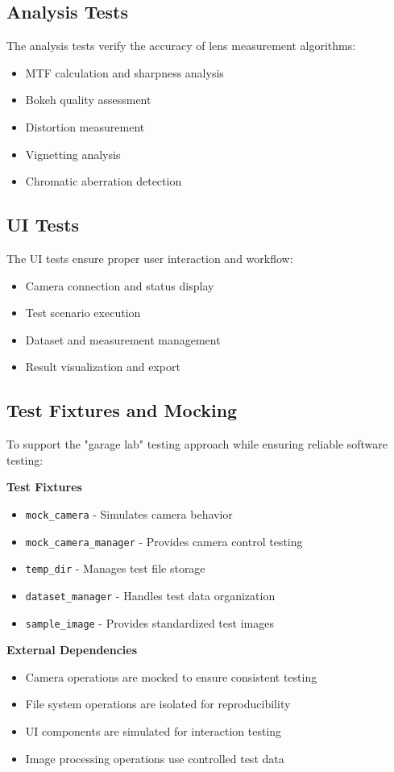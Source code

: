 \subsection{Analysis Tests}
The analysis tests verify the accuracy of lens measurement algorithms:
\begin{itemize}
    \item MTF calculation and sharpness analysis
    \item Bokeh quality assessment
    \item Distortion measurement
    \item Vignetting analysis
    \item Chromatic aberration detection
\end{itemize}

\subsection{UI Tests}
The UI tests ensure proper user interaction and workflow:
\begin{itemize}
    \item Camera connection and status display
    \item Test scenario execution
    \item Dataset and measurement management
    \item Result visualization and export
\end{itemize}

\subsection{Test Fixtures and Mocking}
To support the "garage lab" testing approach while ensuring reliable software testing:

\textbf{Test Fixtures}
\begin{itemize}
    \item \texttt{mock\_camera} - Simulates camera behavior
    \item \texttt{mock\_camera\_manager} - Provides camera control testing
    \item \texttt{temp\_dir} - Manages test file storage
    \item \texttt{dataset\_manager} - Handles test data organization
    \item \texttt{sample\_image} - Provides standardized test images
\end{itemize}

\textbf{External Dependencies}
\begin{itemize}
    \item Camera operations are mocked to ensure consistent testing
    \item File system operations are isolated for reproducibility
    \item UI components are simulated for interaction testing
    \item Image processing operations use controlled test data
\end{itemize}

